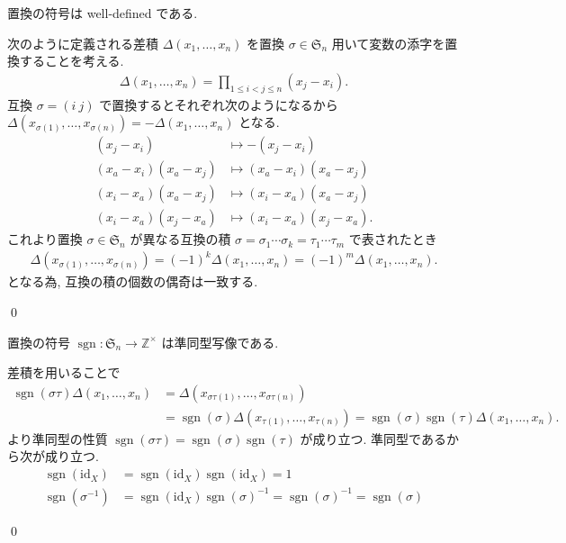 \documentclass[uplatex,dvipdfmx,a4paper,11pt]{jlreq}
\makeatletter
\DeclareMathOperator{\sgn}{sgn}
\newcommand{\ZZ}{\mathbb{Z}}
\renewcommand{\SS}{\mathfrak{S}}
\newcommand{\id}{\mathrm{id}}
\numberwithin{equation}{section}
\theoremstyle{definition}
\renewenvironment{proof}[1][\proofname]{\par
  \normalfont
  \topsep6\p@\@plus6\p@ \trivlist
  \item[\hskip\labelsep{\bfseries #1}\@addpunct{\bfseries}]\ignorespaces\quad\par
}{
  \qed\endtrivlist\@endpefalse
}
\renewcommand\proofname{証明}
\makeatother
\begin{document}
\begin{proposition}[Q21-7(ii)]
  置換の符号は well-defined である.
\end{proposition}
\begin{proof}
  次のように定義される差積 $\Delta(x_1,\ldots,x_n)$ を置換 $\sigma\in\SS_n$ 用いて変数の添字を置換することを考える.
  \begin{align}
    \Delta(x_1,\ldots,x_n) = \prod_{1\leq i<j\leq n}(x_j - x_i).
  \end{align}
  互換 $\sigma = (i\ j)$ で置換するとそれぞれ次のようになるから $\Delta(x_{\sigma(1)},\ldots,x_{\sigma(n)}) = -\Delta(x_1,\ldots,x_n)$ となる.
  \begin{align}
    (x_j - x_i)            & \mapsto -(x_j - x_i)            \\
    (x_a - x_i)(x_a - x_j) & \mapsto (x_a - x_i)(x_a - x_j)  \\
    (x_i - x_a)(x_a - x_j) & \mapsto (x_i - x_a)(x_a - x_j)  \\
    (x_i - x_a)(x_j - x_a) & \mapsto (x_i - x_a)(x_j - x_a).
  \end{align}
  これより置換 $\sigma\in\SS_n$ が異なる互換の積 $\sigma = \sigma_1\cdots\sigma_k = \tau_1\cdots\tau_m$ で表されたとき
  \begin{align}
    \Delta(x_{\sigma(1)},\ldots,x_{\sigma(n)}) = (-1)^k\Delta(x_1,\ldots,x_n) = (-1)^m\Delta(x_1,\ldots,x_n).
  \end{align}
  となる為, 互換の積の個数の偶奇は一致する.
\end{proof}

\begin{proposition}[Q21-8(i)(ii)(iii)]
  置換の符号 $\sgn: \SS_n\to\ZZ^\times$ は準同型写像である.
\end{proposition}
\begin{proof}
  差積を用いることで
  \begin{align}
    \sgn(\sigma\tau)\Delta(x_1,\ldots,x_n) & = \Delta(x_{\sigma\tau(1)},\ldots,x_{\sigma\tau(n)})                                                 \\
                                           & = \sgn(\sigma)\Delta(x_{\tau(1)},\ldots,x_{\tau(n)}) = \sgn(\sigma)\sgn(\tau)\Delta(x_1,\ldots,x_n).
  \end{align}
  より準同型の性質 $\sgn(\sigma\tau) = \sgn(\sigma)\sgn(\tau)$ が成り立つ. 準同型であるから次が成り立つ.
  \begin{align}
    \sgn(\id_X)       & = \sgn(\id_X)\sgn(\id_X) = 1                                      \\
    \sgn(\sigma^{-1}) & = \sgn(\id_X)\sgn(\sigma)^{-1} = \sgn(\sigma)^{-1} = \sgn(\sigma)
  \end{align}
\end{proof}
\end{document}
